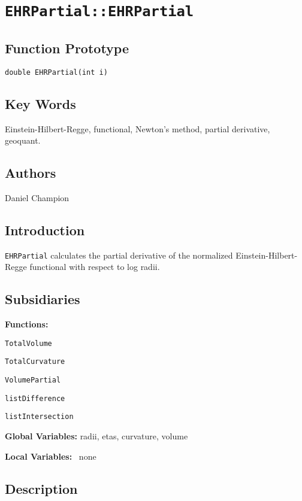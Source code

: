                       

\section*{\texttt{EHRPartial::EHRPartial}}

\subsection*{Function Prototype}

\texttt{double EHRPartial(int i)}

\subsection*{Key Words}

Einstein-Hilbert-Regge, functional, Newton's method, partial derivative,
geoquant.

\subsection*{Authors}

Daniel Champion

\subsection*{Introduction}

\texttt{EHRPartial} calculates the partial derivative of the normalized
Einstein-Hilbert-Regge functional with respect to log radii. \ 

\subsection*{Subsidiaries}

\textbf{Functions:}

\qquad \texttt{TotalVolume}

\qquad \texttt{TotalCurvature}

\qquad \texttt{VolumePartial}

\qquad\qquad\texttt{listDifference}

\qquad\qquad\texttt{listIntersection}

\textbf{Global Variables:} radii, etas, curvature, volume

\textbf{Local Variables:} \ none

\subsection*{Description}

